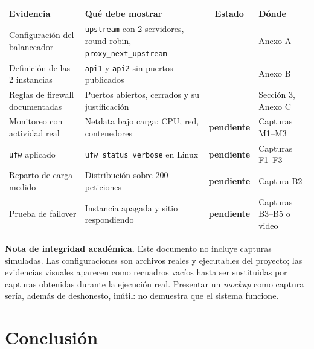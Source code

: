\documentclass[11pt,letterpaper]{article}
\newcommand{\ok}{\textcolor{qcGreen}{\textbf{\checkmark}}}
\newcommand{\pend}{\textcolor{qcAmber}{\textbf{pendiente}}}
\begin{document}
\begin{center}
\begin{tabular}{@{}p{3.9cm} p{5.4cm} c p{2.9cm}@{}}
\toprule
\textbf{Evidencia} & \textbf{Qué debe mostrar} & \textbf{Estado} & \textbf{Dónde} \\
\midrule
Configuración del balanceador & \texttt{upstream} con 2 servidores, round-robin, \texttt{proxy\_next\_upstream} & \ok & Anexo A \\[4pt]
Definición de las 2 instancias & \texttt{api1} y \texttt{api2} sin puertos publicados & \ok & Anexo B \\[4pt]
Reglas de firewall documentadas & Puertos abiertos, cerrados y su justificación & \ok & Sección 3, Anexo C \\[4pt]
Monitoreo con actividad real & Netdata bajo carga: CPU, red, contenedores & \pend & Capturas M1--M3 \\[4pt]
\texttt{ufw} aplicado & \texttt{ufw status verbose} en Linux & \pend & Capturas F1--F3 \\[4pt]
Reparto de carga medido & Distribución sobre 200 peticiones & \pend & Captura B2 \\[4pt]
Prueba de failover & Instancia apagada y sitio respondiendo & \pend & Capturas B3--B5 o video \\
\bottomrule
\end{tabular}
\end{center}

\begin{alerta}
\textbf{Nota de integridad académica.} Este documento no incluye capturas
simuladas. Las configuraciones son archivos reales y ejecutables del proyecto;
las evidencias visuales aparecen como recuadros vacíos hasta ser sustituidas por
capturas obtenidas durante la ejecución real. Presentar un \emph{mockup} como
captura sería, además de deshonesto, inútil: no demuestra que el sistema
funcione.
\end{alerta}

\section{Conclusión}
\end{document}
